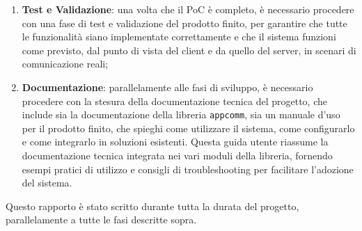 \documentclass[a4paper, 11pt, twoside]{report}
\begin{document}
\begin{enumerate}
\item \textbf{Test e Validazione}: una volta che il PoC è completo, è necessario procedere con una fase di test e
    validazione del prodotto finito, per garantire che tutte le funzionalità siano implementate correttamente e che il
    sistema funzioni come previsto, dal punto di vista del client e da quello del server, in scenari di comunicazione
    reali;

\item \textbf{Documentazione}: parallelamente alle fasi di sviluppo, è necessario procedere con la stesura della
    documentazione tecnica del progetto, che include sia la documentazione della libreria \texttt{appcomm}, sia un
    manuale d'uso per il prodotto finito, che spieghi come utilizzare il sistema, come configurarlo e come integrarlo in
    soluzioni esistenti. Questa guida utente riassume la documentazione tecnica integrata nei vari moduli della libreria,
    fornendo esempi pratici di utilizzo e consigli di troubleshooting per facilitare l'adozione del sistema.

\end{enumerate}

Questo rapporto è stato scritto durante tutta la durata del progetto, parallelamente a tutte le fasi descritte sopra.
\end{document}
